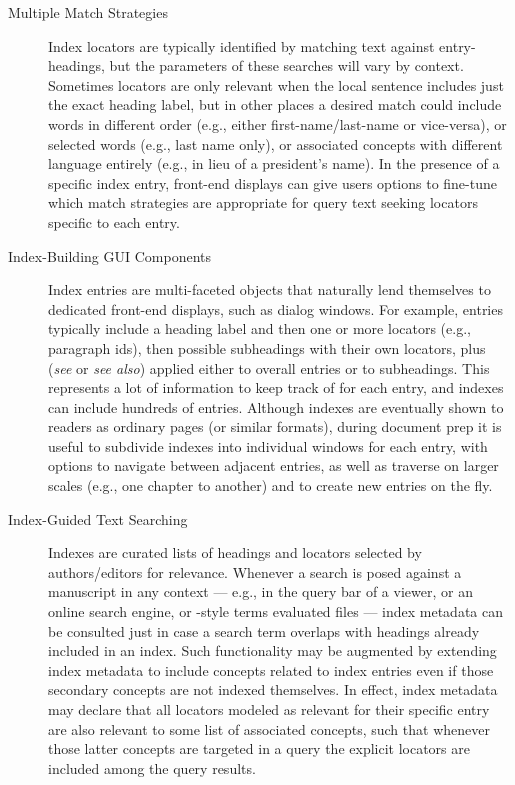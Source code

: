 \documentclass[11pt]{article}
\begin{document}
{{\begin{description}
\item[Multiple Match Strategies]  Index locators are typically 
identified by matching text against entry-headings, but the parameters 
of these searches will vary by context.  Sometimes locators are 
only relevant when the local sentence includes just the exact 
heading label, but in other places a desired match could 
include words in different order (e.g., either first-name/last-name 
or vice-versa), or selected words (e.g., last name only), 
or associated concepts with different language entirely 
(e.g.,  in lieu of a president's name).  In the 
presence of a specific index entry, front-end displays can 
give users options to fine-tune which match strategies are 
appropriate for query text seeking locators specific to each entry.

\item[Index-Building GUI Components]  Index entries are multi-faceted 
objects that naturally lend themselves to dedicated front-end displays, 
such as dialog windows.  For example, entries typically include a heading 
label and then one or more locators (e.g., paragraph ids), 
then possible subheadings with their own 
locators, plus  (\textit{see} or \textit{see also}) applied 
either to overall entries or to subheadings.  This represents a lot 
of information to keep track of for each entry, and indexes can include 
hundreds of entries.  Although indexes are eventually shown 
to readers as ordinary \PDF{} pages (or similar formats), 
during document prep it is useful to subdivide indexes into 
individual \GUI{} windows for each entry, with options to 
navigate between adjacent entries, as well as traverse on larger 
scales (e.g., one chapter to another) and to create new 
entries on the fly.

\item[Index-Guided Text Searching]  Indexes are curated lists 
of headings and locators selected by authors/editors for 
relevance.  Whenever a search is posed against a manuscript in 
any context --- e.g., in the query bar of a \PDF{} viewer, or 
an online search engine, or \XQuery{}-style terms evaluated 
\visavis{} \JATS{} files --- index metadata can be consulted 
just in case a search term overlaps with headings already included 
in an index.  Such functionality may be augmented by extending 
index metadata to include concepts related to index entries 
even if those secondary concepts are not indexed themselves.  
In effect, index metadata may declare that all locators 
modeled as relevant for their specific entry are also relevant 
to some list of associated concepts, such that whenever those 
latter concepts are targeted in a query the explicit 
locators are included among the query results.   


\end{description}}}
\end{document}
